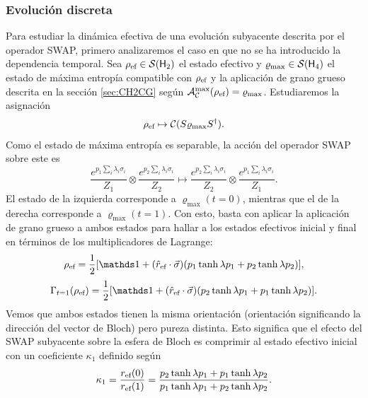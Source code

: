 \subsubsection{Evolución discreta}

Para estudiar la dinámica efectiva de una evolución subyacente descrita por el operador SWAP, primero analizaremos el caso en que no se ha introducido la dependencia temporal. Sea $\rho_{\text{ef}}\in\mathcal{S}({\sf H}_{2})$ el estado efectivo y $\varrho_{\max}\in\mathcal{S}({\sf H}_{4})$ el estado de máxima entropía compatible con $\rho_{\text{ef}}$ y la aplicación de grano grueso descrita en la sección \ref{sec:CH2CG} según $\mathcal{A}_{\mathcal{C}}^{\max}(\rho_{\text{ef}})=\varrho_{\max}$. Estudiaremos la asignación
\begin{equation}
  \rho_{\text{ef}}\mapsto \mathcal{C}(S \varrho_{\max} S^{\dag}).
\end{equation}
Como el estado de máxima entropía es separable, la acción del operador SWAP sobre este es
\begin{equation}
  \frac{e^{p_{1}\sum_{i}\lambda_{i}\sigma_{i}}}{Z_{1}} \otimes \frac{e^{p_{2}\sum_{i}\lambda_{i}\sigma_{i}}}{Z_{2}}\mapsto\frac{e^{p_{2}\sum_{i}\lambda_{i}\sigma_{i}}}{Z_{2}}\otimes\frac{e^{p_{1}\sum_{i}\lambda_{i}\sigma_{i}}}{Z_{1}}.\nonumber
\end{equation}
El estado de la izquierda corresponde a $\varrho_{\max}(t=0)$, mientras que el de la derecha corresponde a $\varrho_{\max}(t=1)$. Con esto, basta con aplicar la aplicación de grano grueso a ambos estados para hallar a los estados efectivos inicial y final en términos de los multiplicadores de Lagrange:
\begin{equation}
\rho_{\ef}=\frac{1}{2}[\Id+(\hat{r}_{\ef}\cdot\vec{\sigma})(p_{1}\tanh{\lambda p_{1}}+p_{2}\tanh{\lambda p_{2}})],
\end{equation}
\begin{equation}
\Gamma_{t=1}(\rho_{\ef})=\frac{1}{2}[\Id+(\hat{r}_{\ef}\cdot\vec{\sigma})(p_{2}\tanh{\lambda p_{1}}+p_{1}\tanh{\lambda p_{2}})].
\end{equation}
Vemos que ambos estados tienen la misma orientación (orientación significando la dirección del vector de Bloch) pero pureza distinta. Esto significa que el efecto del \textsc{SWAP} subyacente sobre la esfera de Bloch es comprimir al estado efectivo inicial con un coeficiente $\kappa_{1}$ definido según
\begin{equation}\label{eq:SWAPFactor}
  \kappa_{1}=\frac{r_{\text{ef}}(0)}{r_{\text{ef}}(1)}=\frac{p_{2}\tanh{\lambda p_{1}}+p_{1}\tanh{\lambda p_{2}}}{
    p_{1}\tanh{\lambda p_{1}}+p_{2}\tanh{\lambda p_{2}}}.
\end{equation}
